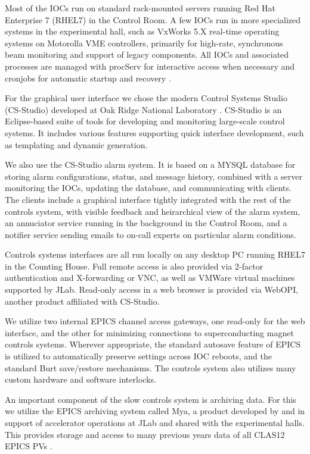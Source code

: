 Most of the IOCs run on standard rack-mounted servers running Red Hat Enterprise 7 (RHEL7) in the Control Room.  A few IOCs run in more specialized systems in the experimental hall, such as VxWorks 5.X real-time operating systems on Motorolla VME controllers, primarily for high-rate, synchronous beam monitoring and support of legacy components.  All IOCs and associated processes are managed with procServ for interactive access when necessary and cronjobs for automatic startup and recovery \cite{procserv-website}.

For the graphical user interface we chose the modern Control Systems Studio (CS-Studio) developed at Oak Ridge National Laboratory \cite{css-website}.   CS-Studio is an Eclipse-based suite of tools for developing and monitoring large-scale control systems.  It includes various features supporting quick interface development, such as templating and dynamic generation.

We also use the CS-Studio alarm system.  It is based on a MYSQL database for storing alarm configurations, status, and message history, combined with a server monitoring the IOCs, updating the database, and communicating with clients.  The clients include a graphical interface tightly integrated with the rest of the controls system, with visible feedback and heirarchical view of the alarm system, an annuciator service running in the background in the Control Room, and a notifier service sending emails to on-call experts on particular alarm conditions.

Controls systems interfaces are all run locally on any desktop PC running RHEL7 in the Counting House.  Full remote access is also provided via 2-factor authentication and X-forwarding or VNC, as well as VMWare virtual machines supported by JLab.  Read-only access in a web browser is provided via WebOPI, another product affiliated with CS-Studio.

We utilize two internal EPICS channel access gateways, one read-only for the web interface, and the other for minimizing connections to superconducting magnet controls systems.  Wherever appropriate, the standard autosave feature of EPICS is utilized to automatically preserve settings across IOC reboots, and the standard Burt save/restore mechanisms.  The controls system also utilizes many custom hardware and software interlocks.

An important component of the slow controls system is archiving data.  For this we utilize the EPICS archiving system called Mya, a product developed by and in support of accelerator operations at JLab and shared with the experimental halls.  This provides storage and access to many previous years data of all CLAS12 EPICS PVs \cite{mya}.


